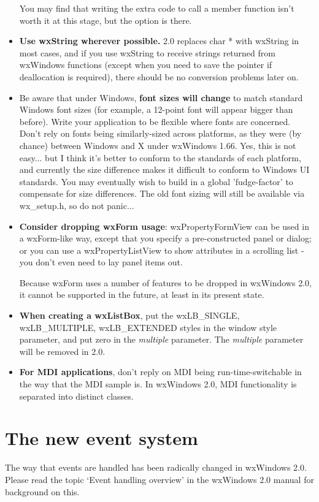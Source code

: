 \begin{itemize}
You may find that writing the extra code to call a member function isn't worth it at this stage,
but the option is there.
\item {\bf Use wxString wherever possible.} 2.0 replaces char * with wxString
in most cases, and if you use wxString to receive strings returned from
wxWindows functions (except when you need to save the pointer if deallocation is required), there should
be no conversion problems later on.
\item Be aware that under Windows, {\bf font sizes will change} to match standard Windows
font sizes (for example, a 12-point font will appear bigger than before). Write your application
to be flexible where fonts are concerned.
Don't rely on fonts being similarly-sized across platforms, as they were (by chance) between
Windows and X under wxWindows 1.66. Yes, this is not easy... but I think it's better to conform to the
standards of each platform, and currently the size difference makes it difficult to
conform to Windows UI standards. You may eventually wish to build in a global 'fudge-factor' to compensate
for size differences. The old font sizing will still be available via wx\_setup.h, so do not panic...
\item {\bf Consider dropping wxForm usage}:
wxPropertyFormView can be used in a wxForm-like way, except that you specify a pre-constructed panel
or dialog; or you can use a wxPropertyListView to show attributes in a scrolling list - you don't even need
to lay panel items out.

Because wxForm uses a number of features to be dropped in wxWindows 2.0, it cannot be
supported in the future, at least in its present state.
\item {\bf When creating a wxListBox}, put the wxLB\_SINGLE, wxLB\_MULTIPLE, wxLB\_EXTENDED styles in the window style parameter, and put
zero in the {\it multiple} parameter. The {\it multiple} parameter will be removed in 2.0.
\item {\bf For MDI applications}, don't reply on MDI being run-time-switchable in the way that the
MDI sample is. In wxWindows 2.0, MDI functionality is separated into distinct classes.
\end{itemize}

\section{The new event system}\label{portingeventsystem}

The way that events are handled has been radically changed in wxWindows 2.0. Please
read the topic `Event handling overview' in the wxWindows 2.0 manual for background
on this.

